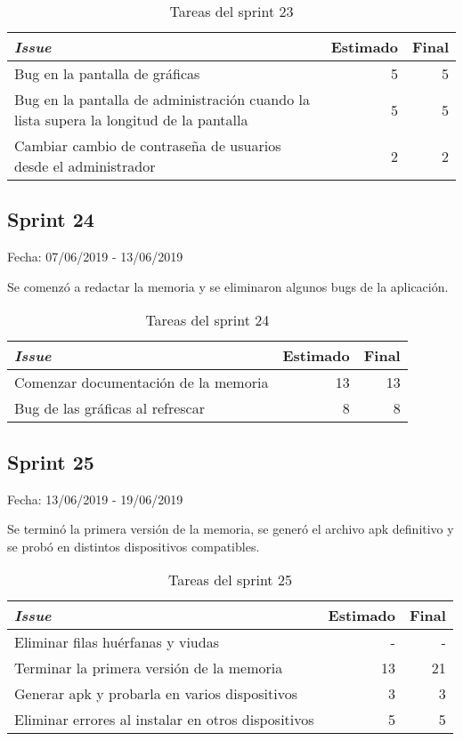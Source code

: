 \begin{table}[H]
	\begin{tabularx}{\textwidth}{Xrr}
		\toprule \textbf{\textit{Issue}} & \textbf{Estimado} & \textbf{Final}\\
		\toprule
		Bug en la pantalla de gráficas & 5 & 5 \\
		Bug en la pantalla de administración cuando la lista supera la longitud de la pantalla & 5 & 5 \\
		Cambiar cambio de contraseña de usuarios desde el administrador & 2 & 2 \\
		\bottomrule
	\end{tabularx}
	\caption{Tareas del sprint 23}
\end{table}

\subsection{Sprint 24}

Fecha: 07/06/2019 - 13/06/2019

Se comenzó a redactar la memoria y se eliminaron algunos bugs de la aplicación. 

\begin{table}[H]
	\begin{tabularx}{\textwidth}{Xrr}
		\toprule \textbf{\textit{Issue}} & \textbf{Estimado} & \textbf{Final}\\
		\toprule
		Comenzar documentación de la memoria & 13 & 13 \\
		Bug de las gráficas al refrescar & 8 & 8 \\
		\bottomrule
	\end{tabularx}
	\caption{Tareas del sprint 24}
\end{table}

\subsection{Sprint 25}

Fecha: 13/06/2019 - 19/06/2019

Se terminó la primera versión de la memoria, se generó el archivo apk definitivo y se probó en distintos dispositivos compatibles. 

\begin{table}[H]
	\begin{tabularx}{\textwidth}{Xrr}
		\toprule \textbf{\textit{Issue}} & \textbf{Estimado} & \textbf{Final}\\
		\toprule
		Eliminar filas huérfanas y viudas & - & - \\
		Terminar la primera versión de la memoria & 13 & 21 \\
		Generar apk y probarla en varios dispositivos & 3 & 3 \\
		Eliminar errores al instalar en otros dispositivos & 5 & 5 \\
		\bottomrule
	\end{tabularx}
	\caption{Tareas del sprint 25}
\end{table}

